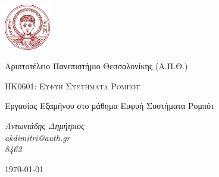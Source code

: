 \begin{titlepage}
	\centering
	\includegraphics[width=0.15\textwidth]{./LogoAUTH.png}\par\vspace{1cm}
	{\huge  Αριστοτέλειο Πανεπιστήμιο Θεσσαλονίκης (Α.Π.Θ.) \par}
	\vspace{2cm}
	{\textsc{ HK0601: Ευφυή Συστήματα Ρομπότ }\par}
	\vspace{2cm}
	{\huge{} Εργασίας Εξαμήνου στο μάθημα Ευφυή Συστήματα Ρομπότ \par}
	\vspace{2cm}
	{\Large\itshape Αντωνιάδης Δημήτριος \\ \textlatin{akdimitri@auth.gr} \\ 8462\par}
	\vfill
	{\large {\today} \par}
\end{titlepage}
